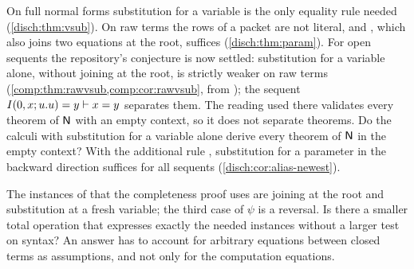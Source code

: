 \begin{question}
\label{disch:q:rawvsub}
On full normal forms substitution for a variable is the only equality rule
needed (\cref{disch:thm:vsub}). On raw terms the rows of a packet are not
literal, and , which also joins two equations at the root,
suffices (\cref{disch:thm:param}). For open sequents the repository's
conjecture is now settled: substitution for a variable alone, without
joining at the root, is strictly weaker on raw terms
(\cref{comp:thm:rawvsub,comp:cor:rawvsub}, from ); the
sequent $I(0,x;u.u)=y\vdash x=y$ separates them. The reading used there
validates every theorem of $\mathsf{N}$ with an empty context, so it does not
separate theorems. Do the calculi with substitution for a variable alone
derive every theorem of $\mathsf{N}$ in the empty context? With the additional
rule , substitution for a parameter in the backward
direction suffices for all sequents (\cref{disch:cor:alias-newest}).
\end{question}

\begin{question}
The instances of  that the completeness proof uses are
joining at the root and substitution at a fresh variable; the third case
of $\psi$ is a reversal. Is there a smaller total operation that expresses
exactly the needed instances without a larger test on syntax? An answer
has to account for arbitrary equations between closed terms as
assumptions, and not only for the computation equations.
\end{question}

